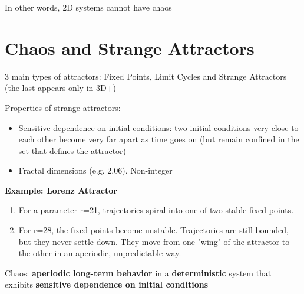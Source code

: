 In other words, 2D systems cannot have chaos 

\section*{Chaos and Strange Attractors}

3 main types of attractors: Fixed Points, Limit Cycles and Strange Attractors (the last 
appears only in 3D+)

Properties of strange attractors:
\begin{itemize}
  \item Sensitive dependence on initial conditions: two initial conditions very 
  close to each other become very far apart as time goes on (but remain confined in the set 
  that defines the attractor)
  \item Fractal dimensions (e.g. $2.06$). Non-integer
\end{itemize}

\textbf{Example: Lorenz Attractor}
\begin{enumerate}
  \item For a parameter r=21, trajectories spiral into one of two stable fixed points.
  \item For r=28, the fixed points become unstable. Trajectories are still 
  bounded, but they never settle down. They move from one "wing" of the 
  attractor to the other in an aperiodic, unpredictable way.
\end{enumerate}

\begin{definition}
Chaos: \textbf{aperiodic long-term behavior} in a \textbf{deterministic} system that exhibits 
\textbf{sensitive dependence on initial conditions}
\end{definition}